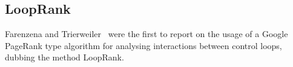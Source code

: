 %
%
%
%
%
%
%
%
%











\subsection{LoopRank}

Farenzena and Trierweiler~\cite{Farenzena2009} were the first to report on the usage of a Google PageRank type algorithm for analysing interactions between control loops, dubbing the method LoopRank.

